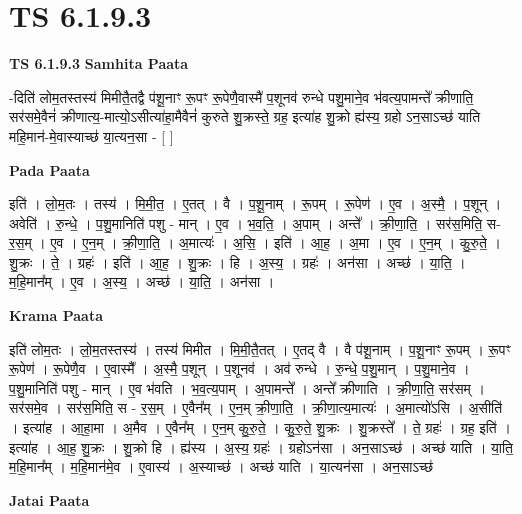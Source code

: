 \documentclass[17pt]{extarticle}
\begin{document}
\section{ TS 6.1.9.3 }

\textbf{TS 6.1.9.3 } \newline
\textbf{Samhita Paata} \newline

-दिति॑ लोम॒तस्तस्य॑ मिमीतै॒तद्वै प॑शू॒नाꣳ रू॒पꣳ रू॒पेणै॒वास्मै॑ प॒शूनव॑ रुन्धे पशु॒माने॒व भ॑वत्य॒पामन्ते᳚ क्रीणाति॒ सर॑समे॒वैनं॑ क्रीणात्य॒-मात्यो॒ऽसीत्या॑हा॒मैवैनं॑ कुरुते शु॒क्रस्ते॒ ग्रह॒ इत्या॑ह शु॒क्रो ह्य॑स्य॒ ग्रहो ऽन॒साऽच्छ॑ याति महि॒मान॑-मे॒वास्याच्छ॑ या॒त्यन॒सा - [  ] \newline

\textbf{Pada Paata} \newline

इति॑ । लो॒म॒तः । तस्य॑ । मि॒मी॒त॒ । ए॒तत् । वै । प॒शू॒नाम् । रू॒पम् । रू॒पेण॑ । ए॒व । अ॒स्मै॒ । प॒शून् । अवेति॑ । रु॒न्धे॒ । प॒शु॒मानिति॑ पशु - मान् । ए॒व । भ॒व॒ति॒ । अ॒पाम् । अन्ते᳚ । क्री॒णा॒ति॒ । सर॑स॒मिति॒ स-र॒स॒म् । ए॒व । ए॒न॒म् । क्री॒णा॒ति॒ । अ॒मात्यः॑ । अ॒सि॒ । इति॑ । आ॒ह॒ । अ॒मा । ए॒व । ए॒न॒म् । कु॒रु॒ते॒ । शु॒क्रः । ते॒ । ग्रहः॑ । इति॑ । आ॒ह॒ । शु॒क्रः । हि । अ॒स्य॒ । ग्रहः॑ । अन॑सा । अच्छ॑ । या॒ति॒ । म॒हि॒मान᳚म् । ए॒व । अ॒स्य॒ । अच्छ॑ । या॒ति॒ । अन॑सा ।  \newline


\textbf{Krama Paata} \newline

इति॑ लोम॒तः । लो॒म॒तस्तस्य॑ । तस्य॑ मिमीत । मि॒मी॒तै॒तत् । ए॒तद् वै । वै प॑शू॒नाम् । प॒शू॒नाꣳ रू॒पम् । रू॒पꣳ रू॒पेण॑ । रू॒पेणै॒व । ए॒वास्मै᳚ । अ॒स्मै॒ प॒शून् । प॒शूनव॑ । अव॑ रुन्धे । रु॒न्धे॒ प॒शु॒मान् । प॒शु॒माने॒व । प॒शु॒मानिति॑ पशु - मान् । ए॒व भ॑वति । भ॒व॒त्य॒पाम् । अ॒पामन्ते᳚ । अन्ते᳚ क्रीणाति । क्री॒णा॒ति॒ सर॑सम् । सर॑समे॒व । सर॑स॒मिति॒ स - र॒स॒म् । ए॒वैन᳚म् । ए॒न॒म् क्री॒णा॒ति॒ । क्री॒णा॒त्य॒मात्यः॑ । अ॒मात्यो॑ऽसि । अ॒सीति॑ । इत्या॑ह । आ॒हा॒मा । अ॒मैव । ए॒वैन᳚म् । ए॒न॒म् कु॒रु॒ते॒ । कु॒रु॒ते॒ शु॒क्रः । शु॒क्रस्ते᳚ । ते॒ ग्रहः॑ । ग्रह॒ इति॑ । इत्या॑ह । आ॒ह॒ शु॒क्रः । शु॒क्रो हि । ह्य॑स्य । अ॒स्य॒ ग्रहः॑ । ग्रहोऽन॑सा । अन॒साऽच्छ॑ । अच्छ॑ याति । या॒ति॒ म॒हि॒मान᳚म् । म॒हि॒मान॑मे॒व । ए॒वास्य॑ । अ॒स्याच्छ॑ । अच्छ॑ याति । या॒त्यन॑सा । अन॒साऽच्छ॑ \newline

\textbf{Jatai Paata} \newline
\end{document}
